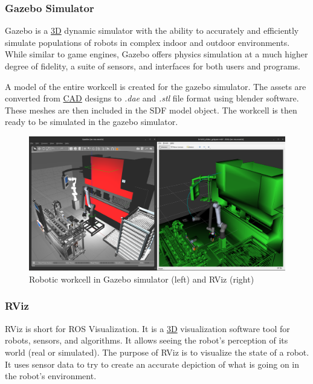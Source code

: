 \subsubsection{Gazebo Simulator}
\label{subsubsec:gazebo}
Gazebo is a \hyperref[acro:3D]{3D} dynamic simulator with the ability to accurately and efficiently simulate populations
of robots in complex indoor and outdoor environments. While similar to game engines, Gazebo
offers physics simulation at a much higher degree of fidelity, a suite of sensors, and interfaces for
both users and programs. \cite{gazebo-classic}

A model of the entire workcell is created for the gazebo simulator. The assets are converted from \hyperref[acro:CAD]{CAD} designs
to \textit{.dae} and \textit{.stl} file format using blender software. These meshes are then included in the SDF model object.
The workcell is then ready to be simulated in the gazebo simulator.

\begin{figure}[h]
    \centering
    \includegraphics[width=\textwidth]{figures/gazebo-rviz.png}
    \caption{Robotic workcell in Gazebo simulator (left) and RViz (right)}
    \label{fig:gazebo-rviz}
\end{figure}

\subsubsection{RViz}
\label{subsubsec:RViz}
RViz is short for ROS Visualization. It is a \hyperref[acro:3D]{3D} visualization software tool for robots, sensors, and algorithms.
It allows seeing the robot's perception of its world (real or simulated).
The purpose of RViz is to visualize the state of a robot. It uses sensor data to try
to create an accurate depiction of what is going on in the robot's environment. \cite{rviz}

